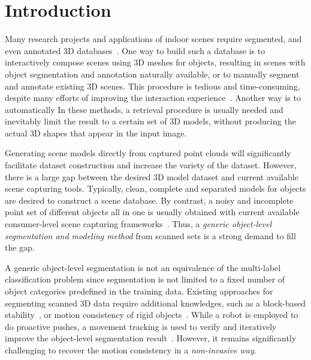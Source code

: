 \section{Introduction}
\label{sec:intro}
Many research projects and applications of indoor scenes require segmented, and even annotated 3D databases~\cite{SearchClassify,SceneFromExample,Fisher:2012:ESO:2366145.2366154,Chen:2014:ASM:2661229.2661239,Fisher:ActivityCentricSceneSynthesis}.
%
One way to build such a database is to interactively compose scenes using 3D meshes for objects, resulting in scenes with object segmentation and annotation naturally available, or to manually segment and annotate existing 3D scenes. This procedure is tedious and time-consuming, despite many efforts of improving the interaction experience~\cite{Merrell:2011:IFL:2010324.1964982, Xu:2013:SSC:2461912.2461968}. 
%
Another way is to automatically   
In these methods, a retrieval procedure is usually needed and inevitably limit the result to a certain set of 3D models, without producing the actual 3D shapes that appear in the input image.

Generating scene models directly from captured point clouds will significantly facilitate dataset construction and increase the variety of the dataset. 
However, there is a large gap between the desired 3D model dataset and current available scene capturing tools. Typically, clean, complete and separated models for objects are desired to construct a scene database. 
By contrast, a noisy and incomplete point set of different objects all in one is usually obtained with current available consumer-level scene capturing frameworks~\cite{KinectFusion,VXH,dai2016bundlefusion}. 
Thus, a \emph{generic object-level segmentation and modeling method} from scanned sets is a strong demand to fill the gap.

A generic object-level segmentation is not an equivalence of the multi-label classification problem since segmentation is not limited to a fixed number of object categories predefined in the training data. 
Existing approaches for segmenting scanned 3D data require additional knowledges, such as a block-based stability~\cite{3DReasoningfromBlockstoStability}, or motion consistency of rigid objects~\cite{Xu:2015:ACS:2816795.2818075}. 
While a robot is employed to do proactive pushes, a movement tracking is used to verify and iteratively improve the object-level segmentation result~\cite{Xu:2015:ACS:2816795.2818075}.
However, it remains significantly challenging to recover the motion consistency in a \emph{non-invasive way}. 

